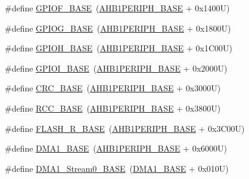 \begin{DoxyCompactItemize}
\item 
\#define \hyperlink{group___peripheral__registers__structures_ga7f9a3f4223a1a784af464a114978d26e}{G\+P\+I\+O\+F\+\_\+\+B\+A\+SE}~(\hyperlink{group___peripheral__memory__map_ga811a9a4ca17f0a50354a9169541d56c4}{A\+H\+B1\+P\+E\+R\+I\+P\+H\+\_\+\+B\+A\+SE} + 0x1400\+U)
\item 
\#define \hyperlink{group___peripheral__registers__structures_ga5d8ca4020f2e8c00bde974e8e7c13cfe}{G\+P\+I\+O\+G\+\_\+\+B\+A\+SE}~(\hyperlink{group___peripheral__memory__map_ga811a9a4ca17f0a50354a9169541d56c4}{A\+H\+B1\+P\+E\+R\+I\+P\+H\+\_\+\+B\+A\+SE} + 0x1800\+U)
\item 
\#define \hyperlink{group___peripheral__registers__structures_gaee4716389f3a1c727495375b76645608}{G\+P\+I\+O\+H\+\_\+\+B\+A\+SE}~(\hyperlink{group___peripheral__memory__map_ga811a9a4ca17f0a50354a9169541d56c4}{A\+H\+B1\+P\+E\+R\+I\+P\+H\+\_\+\+B\+A\+SE} + 0x1\+C00\+U)
\item 
\#define \hyperlink{group___peripheral__registers__structures_ga50acf918c2e1c4597d5ccfe25eb3ad3d}{G\+P\+I\+O\+I\+\_\+\+B\+A\+SE}~(\hyperlink{group___peripheral__memory__map_ga811a9a4ca17f0a50354a9169541d56c4}{A\+H\+B1\+P\+E\+R\+I\+P\+H\+\_\+\+B\+A\+SE} + 0x2000\+U)
\item 
\#define \hyperlink{group___peripheral__registers__structures_ga656a447589e785594cbf2f45c835ad7e}{C\+R\+C\+\_\+\+B\+A\+SE}~(\hyperlink{group___peripheral__memory__map_ga811a9a4ca17f0a50354a9169541d56c4}{A\+H\+B1\+P\+E\+R\+I\+P\+H\+\_\+\+B\+A\+SE} + 0x3000\+U)
\item 
\#define \hyperlink{group___peripheral__registers__structures_ga0e681b03f364532055d88f63fec0d99d}{R\+C\+C\+\_\+\+B\+A\+SE}~(\hyperlink{group___peripheral__memory__map_ga811a9a4ca17f0a50354a9169541d56c4}{A\+H\+B1\+P\+E\+R\+I\+P\+H\+\_\+\+B\+A\+SE} + 0x3800\+U)
\item 
\#define \hyperlink{group___peripheral__registers__structures_ga8e21f4845015730c5731763169ec0e9b}{F\+L\+A\+S\+H\+\_\+\+R\+\_\+\+B\+A\+SE}~(\hyperlink{group___peripheral__memory__map_ga811a9a4ca17f0a50354a9169541d56c4}{A\+H\+B1\+P\+E\+R\+I\+P\+H\+\_\+\+B\+A\+SE} + 0x3\+C00\+U)
\item 
\#define \hyperlink{group___peripheral__registers__structures_gab2d8a917a0e4ea99a22ac6ebf279bc72}{D\+M\+A1\+\_\+\+B\+A\+SE}~(\hyperlink{group___peripheral__memory__map_ga811a9a4ca17f0a50354a9169541d56c4}{A\+H\+B1\+P\+E\+R\+I\+P\+H\+\_\+\+B\+A\+SE} + 0x6000\+U)
\item 
\#define \hyperlink{group___peripheral__registers__structures_ga0d3c52aa35dcc68f78b704dfde57ba95}{D\+M\+A1\+\_\+\+Stream0\+\_\+\+B\+A\+SE}~(\hyperlink{group___peripheral__memory__map_gab2d8a917a0e4ea99a22ac6ebf279bc72}{D\+M\+A1\+\_\+\+B\+A\+SE} + 0x010\+U)

\end{DoxyCompactItemize}
